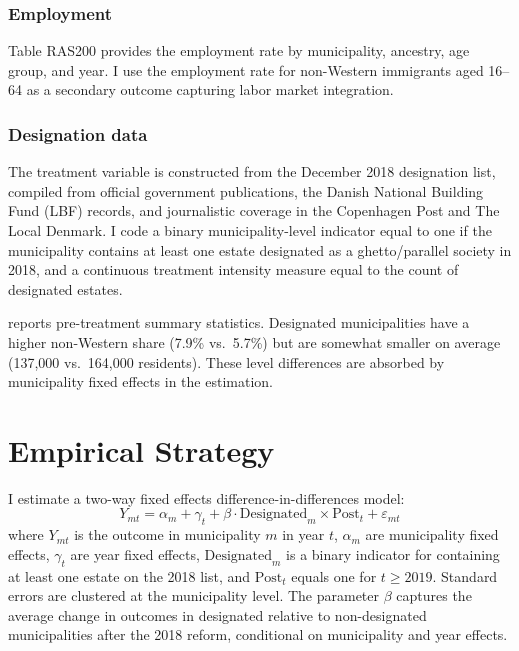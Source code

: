 \documentclass[12pt]{article}
\begin{document}
\subsubsection*{Employment} Table RAS200 provides the employment rate by municipality, ancestry, age group, and year. I use the employment rate for non-Western immigrants aged 16--64 as a secondary outcome capturing labor market integration.

\subsubsection*{Designation data} The treatment variable is constructed from the December 2018 designation list, compiled from official government publications, the Danish National Building Fund (LBF) records, and journalistic coverage in the Copenhagen Post and The Local Denmark. I code a binary municipality-level indicator equal to one if the municipality contains at least one estate designated as a ghetto/parallel society in 2018, and a continuous treatment intensity measure equal to the count of designated estates.



 reports pre-treatment summary statistics. Designated municipalities have a higher non-Western share (7.9\% vs.\ 5.7\%) but are somewhat smaller on average (137,000 vs.\ 164,000 residents). These level differences are absorbed by municipality fixed effects in the estimation.

\section{Empirical Strategy}

I estimate a two-way fixed effects difference-in-differences model:
\begin{equation}
Y_{mt} = \alpha_m + \gamma_t + \beta \cdot \text{Designated}_m \times \text{Post}_t + \varepsilon_{mt}
\label{eq:did}
\end{equation}
where $Y_{mt}$ is the outcome in municipality $m$ in year $t$, $\alpha_m$ are municipality fixed effects, $\gamma_t$ are year fixed effects, $\text{Designated}_m$ is a binary indicator for containing at least one estate on the 2018 list, and $\text{Post}_t$ equals one for $t \geq 2019$. Standard errors are clustered at the municipality level. The parameter $\beta$ captures the average change in outcomes in designated relative to non-designated municipalities after the 2018 reform, conditional on municipality and year effects.
\end{document}

